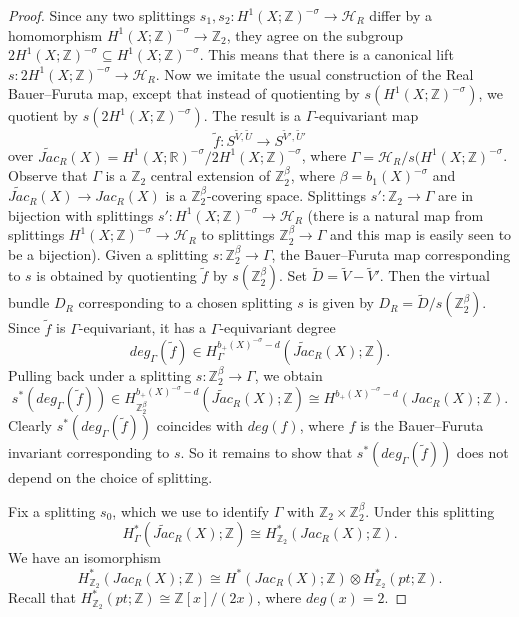 \documentclass[10pt,a4paper]{amsart}
\begin{document}
\begin{proof}
Since any two splittings $s_1,s_2 : H^1(X ; \mathbb{Z})^{-\sigma} \to \mathcal{H}_R$ differ by a homomorphism $H^1(X ; \mathbb{Z})^{-\sigma} \to \mathbb{Z}_2$, they agree on the subgroup $2 H^1(X ; \mathbb{Z})^{-\sigma} \subseteq H^1(X ; \mathbb{Z})^{-\sigma}$. This means that there is a canonical lift $s : 2 H^1(X ; \mathbb{Z})^{-\sigma} \to \mathcal{H}_R$. Now we imitate the usual construction of the Real Bauer--Furuta map, except that instead of quotienting by $s(H^1(X ; \mathbb{Z})^{-\sigma})$, we quotient by $s(2H^1(X;\mathbb{Z})^{-\sigma})$. The result is a $\Gamma$-equivariant map 
\[
\widetilde{f} : S^{\widetilde{V} , \widetilde{U}} \to S^{\widetilde{V}' , \widetilde{U}'}
\]
over $\widetilde{Jac}_R(X) = H^1(X;\mathbb{R})^{-\sigma}/2H^1(X;\mathbb{Z})^{-\sigma}$, where $\Gamma = \mathcal{H}_R/s(H^1(X;\mathbb{Z})^{-\sigma}$. Observe that $\Gamma$ is a $\mathbb{Z}_2$ central extension of $\mathbb{Z}_2^{\beta}$, where $\beta = b_1(X)^{-\sigma}$ and $\widetilde{Jac}_R(X) \to Jac_R(X)$ is a $\mathbb{Z}_2^\beta$-covering space. Splittings $s' : \mathbb{Z}_2 \to \Gamma$ are in bijection with splittings $s' : H^1(X ; \mathbb{Z})^{-\sigma} \to \mathcal{H}_R$ (there is a natural map from splittings $H^1(X;\mathbb{Z})^{-\sigma} \to \mathcal{H}_R$ to splittings $\mathbb{Z}_2^\beta \to \Gamma$ and this map is easily seen to be a bijection). Given a splitting $s : \mathbb{Z}_2^\beta \to \Gamma$, the Bauer--Furuta map corresponding to $s$ is obtained by quotienting $\widetilde{f}$ by $s(\mathbb{Z}_2^\beta)$. Set $\widetilde{D} = \widetilde{V} - \widetilde{V}'$. Then the virtual bundle $D_R$ corresponding to a chosen splitting $s$ is given by $D_R = \widetilde{D}/s(\mathbb{Z}_2^\beta)$. Since $\widetilde{f}$ is $\Gamma$-equivariant, it has a $\Gamma$-equivariant degree
\[
deg_{\Gamma}( \widetilde{f} ) \in H^{b_+(X)^{-\sigma}-d}_\Gamma( \widetilde{Jac}_R(X) ; \mathbb{Z}).
\]
Pulling back under a splitting $s : \mathbb{Z}_2^\beta \to \Gamma$, we obtain
\[
s^*( deg_{\Gamma}(\widetilde{f})) \in H^{b_+(X)^{-\sigma}-d}_{\mathbb{Z}_2^\beta}( \widetilde{Jac}_R(X) ; \mathbb{Z}) \cong H^{b_+(X)^{-\sigma}-d}(Jac_R(X) ; \mathbb{Z}).
\]
Clearly $s^*(deg_{\Gamma}(\widetilde{f}))$ coincides with $deg(f)$, where $f$ is the Bauer--Furuta invariant corresponding to $s$. So it remains to show that $s^*( deg_{\Gamma}(\widetilde{f}))$ does not depend on the choice of splitting.

Fix a splitting $s_0$, which we use to identify $\Gamma$ with $\mathbb{Z}_2 \times \mathbb{Z}_2^\beta$. Under this splitting
\[
H^*_{\Gamma}(\widetilde{Jac}_R(X) ; \mathbb{Z}) \cong H^*_{\mathbb{Z}_2}( Jac_R(X) ; \mathbb{Z}).
\]
We have an isomorphism
\[
H^*_{\mathbb{Z}_2}( Jac_R(X) ; \mathbb{Z}) \cong H^*( Jac_R(X) ; \mathbb{Z}) \otimes H^*_{\mathbb{Z}_2}(pt ; \mathbb{Z}).
\]
Recall that $H^*_{\mathbb{Z}_2}(pt ; \mathbb{Z}) \cong \mathbb{Z}[x]/(2x)$, where $deg(x) = 2$.


\end{proof}
\end{document}
